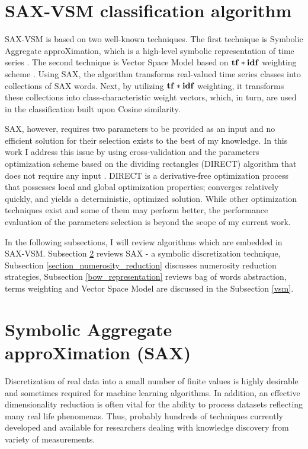 \section{SAX-VSM classification algorithm} \label{sax_vsm_background}
SAX-VSM is based on two well-known techniques. The first technique is Symbolic Aggregate approXimation, which is a high-level symbolic
representation of time series \cite{sax}. The second technique is Vector Space Model based on $\text{\textbf{tf}}\ast\text{\textbf{idf}}$
weighting scheme \cite{citeulike:300428}. 
Using SAX, the algorithm transforms real-valued time series classes into collections of SAX words. 
Next, by utilizing $\text{\textbf{tf}}\ast\text{\textbf{idf}}$ weighting, it transforms these collections into class-characteristic weight 
vectors, which, in turn, are used in the classification built upon Cosine similarity.

SAX, however, requires two parameters to be provided as an input and no efficient solution for their selection exists to the best of my knowledge. 
In this work I address this issue by using cross-validation and the parameters optimization scheme based on the dividing rectangles (DIRECT) 
algorithm that does not require any input \cite{citeulike:12563460}. 
DIRECT is a derivative-free optimization process that possesses local and global optimization properties; converges relatively quickly, and yields 
a deterministic, optimized solution. While other optimization techniques exist and some of them may perform better, the performance 
evaluation of the parameters selection is beyond the scope of my current work.

In the following subsections, I will review algorithms which are embedded in SAX-VSM. 
Subsection \ref{section-sax} reviews SAX - a symbolic discretization technique, 
Subsection \ref{section_numerosity_reduction} discusses numerosity reduction strategies,
Subsection \ref{bow_representation} reviews bag of words abstraction, 
terms weighting and Vector Space Model are discussed in the Subsection \ref{vsm}. 


\section{Symbolic Aggregate approXimation (SAX)}\label{section-sax}
Discretization of real data into a small number of finite values is highly desirable and sometimes required for machine learning 
algorithms. In addition, an effective dimensionality reduction is often vital for the ability to process datasets reflecting 
many real life phenomenas. Thus, probably hundreds of techniques currently developed and available for researchers dealing 
with knowledge discovery from variety of measurements.

